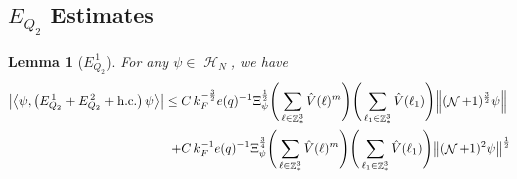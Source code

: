 \documentclass[sn-mathphys, Numbered ,a4paper]{sn-jnl}%
\DeclareMathOperator{\Z}{\mathbb{Z}}
\DeclareMathOperator{\HH}{\mathcal{H}}
\DeclareMathOperator{\NN}{\mathcal{N}}
\newcommand{\half}{\frac{1}{2}}
\newcommand{\eva}[1]{\left\langle #1 \right\rangle}
\theoremstyle{plain}
\newtheorem{lemma}[theorem]{Lemma}
\theoremstyle{definition}
\theoremstyle{remark}
\theoremstyle{plain}
\theoremstyle{definition}
\theoremstyle{remark}
\begin{document}
\subsection{$E_{Q_2}$ Estimates}
\begin{lemma}[$E_{Q_2}^{\,1}$]\label{lem:EQ211}
    For any $\psi \in \HH_N$, we have
    \begin{align}
    	\abs{\eva{\psi,\left(E^{\,1}_{Q_2}+E^{\,2}_{Q_2}+\mathrm{h.c.}\right) \psi }}
    	 \leq \; &C\,  k_{F}^{-\frac{3}{2}} e(q)^{-1}  \Xi_{\psi}^\half \Bigg(\sum\limits_{\ell \in \Z^3_*} \hat{V}(\ell)^m\Bigg)\Bigg( \sum\limits_{\ell_1 \in \Z^3_*} \hat{V}(\ell_1) \Bigg) \norm { (\NN+1)^{\frac{3}{2}} \psi }\\
    	 \;+ &C\, k_{F}^{-1} e(q)^{-1} \Xi_{\psi}^{\frac{3}{4}} \Bigg(\sum\limits_{\ell \in \Z^3_*} \hat{V}(\ell)^m\Bigg) \Bigg(\sum\limits_{\ell_1 \in \Z^3_*} \hat{V}(\ell_1) \Bigg)  \norm{ (\NN+1)^2\psi}^\half\label{eq:estEQ211}
    \end{align}
\end{lemma}
\end{document}
